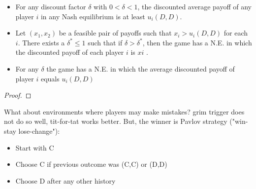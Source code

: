 \begin{theorem}
    \begin{itemize}
        \item For any discount factor $\delta$ with $0<\delta<1$, the discounted average payoff of any player $i$ in any Nash equilibrium is at least $u_i (D,D)$.
        \item Let $(x_1 ,x_2)$ be a feasible pair of payoffs such that $x_i >u_i (D,D)$ for each $i$. There exists a
              $\delta^* \le 1$ such that if $\delta>\delta^* $, then the game has a N.E. in which the discounted payoff of each
              player $i$ is $x i$ .
        \item For any $\delta$ the game has a N.E. in which the average discounted payoff of player $i$ equals $u_i (D,D)$
    \end{itemize}
\end{theorem}
\begin{proof}

\end{proof}
\begin{illustration}
    What about environments where players may make mistakes? grim trigger does not do so well, tit-for-tat works better. But, the winner is Pavlov strategy
    ("win-stay lose-change"):
    \begin{itemize}
        \item Start with C
        \item Choose C if previous outcome was (C,C) or (D,D)
        \item Choose D after any other history
    \end{itemize}
\end{illustration}

